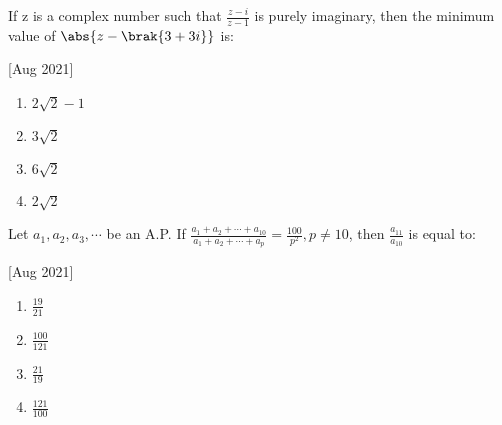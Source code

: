     \item If z is a complex number such that $\frac{z-i}{z-1}$ is purely imaginary, then the minimum value of $\abs{z-\brak{3+3i}}$ is:
    
    \hfill[Aug 2021]

        \begin{multicols}{4}
            \begin{enumerate}
                \item $2\sqrt{2}-1$
                \item $3\sqrt{2}$
                \item $6\sqrt{2}$
                \item $2\sqrt{2}$
            \end{enumerate}
        \end{multicols}

    \item Let $a_1,a_2,a_3,\cdots$ be an A.P. If $\frac{a_1+a_2+\cdots+a_{10}}{a_1+a_2+\cdots+a_p}=\frac{100}{p^2},p\neq10$, then $\frac{a_{11}}{a_{10}}$ is equal to:
    
    \hfill[Aug 2021]
    
        \begin{multicols}{4}
            \begin{enumerate}
                \item $\frac{19}{21}$
                \item $\frac{100}{121}$
                \item $\frac{21}{19}$
                \item $\frac{121}{100}$
            \end{enumerate}
        \end{multicols}
